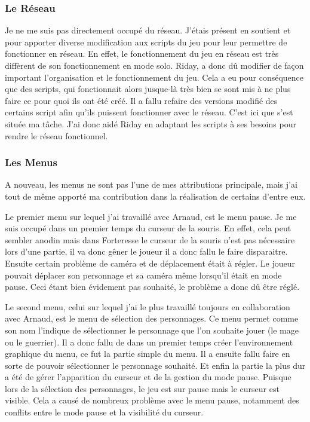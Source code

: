 \documentclass[a4paper, 12pt]{article}
\begin{document}
		\subsubsection{Le Réseau}
		Je ne me suis pas directement occupé du réseau. J’étais présent en soutient et pour apporter diverse modification aux scripts du jeu pour leur permettre de fonctionner en réseau. En effet, le fonctionnement du jeu en réseau est très diffèrent de son fonctionnement en mode solo. Riday, a donc dû modifier de façon important l’organisation et le fonctionnement du jeu. Cela a eu pour conséquence que des scripts, qui fonctionnait alors jusque-là très bien se sont mis à ne plus faire ce pour quoi ils ont été créé. Il a fallu refaire des versions modifié des certains script afin qu’ils puissent fonctionner avec le réseau. C’est ici que s’est située ma tâche. J’ai donc aidé Riday en adaptant les scripts à ses besoins pour rendre le réseau fonctionnel.
		
		\subsubsection{Les Menus}
		
		A nouveau, les menus ne sont pas l’une de mes attributions principale, mais j’ai tout de même apporté ma contribution dans la réalisation de certains d’entre eux.
\par Le premier menu sur lequel j’ai travaillé avec Arnaud, est le menu pause. Je me suis occupé dans un premier temps du curseur de la souris. En effet, cela peut sembler anodin mais dans Forteresse le curseur de la souris n’est pas nécessaire lors d’une partie, il va donc gêner le joueur il a donc fallu le faire disparaitre. Ensuite certain problème de caméra et de déplacement était à régler. Le joueur pouvait déplacer son personnage et sa caméra même lorsqu’il était en mode pause. Ceci étant bien évidement pas souhaité, le problème a donc dû être réglé. 
\par Le second menu, celui sur lequel j’ai le plus travaillé toujours en collaboration avec Arnaud, est le menu de sélection des personnages. Ce menu permet comme son nom l’indique de sélectionner le personnage que l’on souhaite jouer (le mage ou le guerrier). Il a donc fallu de dans un premier temps créer l’environnement graphique du menu, ce fut la partie simple du menu. Il a ensuite fallu faire en sorte de pouvoir sélectionner le personnage souhaité. Et enfin la partie la plus dur a été de gérer l’apparition du curseur et de la gestion du mode pause. Puisque lors de la sélection des personnages, le jeu est sur pause mais le curseur est visible. Cela a causé de nombreux problème avec le menu pause, notamment des conflits entre le mode pause et la visibilité du curseur.
\end{document}
